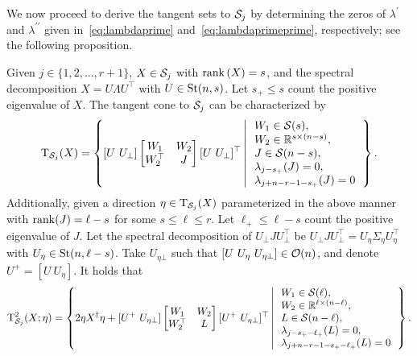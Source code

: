 We now proceed to derive the tangent sets to $\mathcal{S}_j$ by determining the zeros of $\lambda^\prime$ and $\lambda^{\prime\prime}$ given in~\eqref{eq:lambdaprime} and~\eqref{eq:lambdaprimeprime}, respectively; see the following proposition.

\begin{proposition}\label{pro:tangenttoSj}
    Given $j\in\{1,2,\ldots,r+1\}$, $X\in\mathcal{S}_j$ with $\operatorname{rank}{(X)}=s$, and the spectral decomposition $X=U\varLambda U^\top$ with $U\in\mathrm{St}(n,s)$. Let $s_+\le s$ count the positive eigenvalue of $X$. The tangent cone to $\mathcal{S}_j$ can be characterized by
    \begin{equation}\label{eq:tangenttoSj}
        \mathrm{T}_{\mathcal{S}_j}(X)=\left\{ {[U\ U_{\bot}]\left[ \begin{matrix}
        	W_1&		W_2\\
        	W_2^\top&		J\\
        \end{matrix} \right][U\ U_{\bot}]^\top \left|\,\begin{array}{l}
        W_1\in\mathcal{S}(s),
        \\
        W_2\in\mathbb{R}^{s\times (n-s)},
        \\
        J \in \mathcal{S}(n-s),
        \\
        \lambda_{j-s_+}(J)=0,
        \\
        \lambda_{j+n-r-1-s_+}(J)=0
        \end{array}\right.
        } \right\}.
    \end{equation}
    Additionally, given a direction $\eta\in\mathrm{T}_{\mathcal{S}_j}(X)$ parameterized in the above manner with $\operatorname{rank}(J)=\ell-s$ for some $s\le\ell\le r$. Let $\ell_+\le \ell -s$ count the positive eigenvalue of $J$. Let the spectral decomposition of $U_\bot J U^\top_\bot$ be $U_\bot J U^\top_\bot=U_{\eta} \varSigma_\eta U_{\eta}^\top$ with $U_{\eta}\in\mathrm{St}(n,\ell-s)$. Take ${U}_{\eta\bot}$ such that $[U\ U_\eta\ U_{\eta\bot}]\in\orth(n)$, and denote $U^+=[U\ U_{\eta}]$. It holds that
    \begin{equation}\label{eq:tangenttwotoSj}
        \mathrm{T}^2_{\mathcal{S}_j}(X;\eta)=\left\{ {2\eta X^\dagger\eta + [U^+\ U_{\eta\bot}]\left[ \begin{matrix}
        	W_1&		W_2\\
        	W_2^\top&		L\\
        \end{matrix} \right][U^+\ U_{\eta\bot}]^\top \left|\,\begin{array}{l}
        W_1\in\mathcal{S}(\ell),
        \\
        W_2\in\mathbb{R}^{\ell\times (n-\ell)},
        \\
        L\in\mathcal{S}(n-\ell),
        \\
        \lambda_{j-s_+-\ell_+}(L) = 0,
        \\
        \lambda_{j+n-r-1-s_+-\ell_+}(L) = 0
        \end{array}\right.
        } \right\}.
    \end{equation}
\end{proposition}
